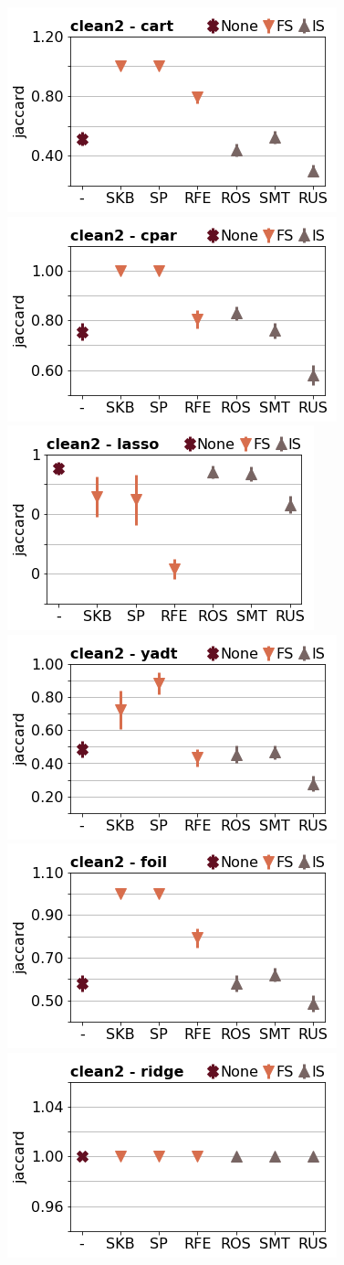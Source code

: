 \documentclass[runningheads,a4paper]{llncs}
\begin{document}
\begin{figure}[!h]
\includegraphics[width=0.32\linewidth]{fig/preps_clean2_DT_sklearn_jaccard.png}
\includegraphics[width=0.32\linewidth]{fig/preps_clean2_RB_cpar_jaccard.png}
\includegraphics[width=0.32\linewidth]{fig/preps_clean2_LM_lasso_jaccard.png}
\includegraphics[width=0.32\linewidth]{fig/preps_clean2_DT_yadt_jaccard.png}
\includegraphics[width=0.32\linewidth]{fig/preps_clean2_RB_foil_jaccard.png}
\includegraphics[width=0.32\linewidth]{fig/preps_clean2_LM_ridge_jaccard.png}
\end{figure}
\end{document}
